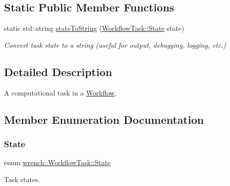 \subsection*{Static Public Member Functions}
\begin{DoxyCompactItemize}
\item 
static std\+::string \hyperlink{classwrench_1_1_workflow_task_a542a6f96bea2d2e67d21bc32c0151e73}{state\+To\+String} (\hyperlink{classwrench_1_1_workflow_task_a1184f3d7aea21e1c87a9b17e84f1f92a}{Workflow\+Task\+::\+State} state)
\begin{DoxyCompactList}\small\item\em Convert task state to a string (useful for output, debugging, logging, etc.) \end{DoxyCompactList}\end{DoxyCompactItemize}


\subsection{Detailed Description}
A computational task in a \hyperlink{classwrench_1_1_workflow}{Workflow}. 

\subsection{Member Enumeration Documentation}
\mbox{\label{classwrench_1_1_workflow_task_a1184f3d7aea21e1c87a9b17e84f1f92a}} 
\subsubsection{\texorpdfstring{State}{State}}
{\footnotesize\ttfamily enum \hyperlink{classwrench_1_1_workflow_task_a1184f3d7aea21e1c87a9b17e84f1f92a}{wrench\+::\+Workflow\+Task\+::\+State}}



Task states. 

